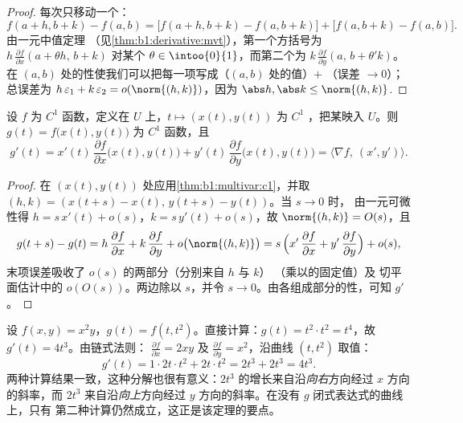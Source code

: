 \begin{proof}
每次只移动一个：
\[
f(a+h, b+k) - f(a,b)
= \bigl[f(a+h, b+k) - f(a, b+k)\bigr] + \bigl[f(a, b+k) -
f(a,b)\bigr].
\]
由一元中值定理
（见\cref{thm:b1:derivative:mvt}），第一个方括号为 $h\,
\frac{\partial f}{\partial x}(a + \theta h,\, b + k)$ 对某个
$\theta \in \intoo{0}{1}$，而第二个为 $k\,\frac{\partial
f}{\partial y}(a,\, b + \theta' k)$。在
$(a,b)$ 处的性使我们可以把每一项写成（$(a,b)$ 处的值）$+$
（误差 $\to 0$）；总误差为 $h\,\varepsilon_1 +
k\,\varepsilon_2 = o(\norm{(h,k)})$，因为 $\abs h, \abs k \leq
\norm{(h,k)}$.
\end{proof}

\begin{theorem}[链式法则]\label{thm:b1:multivar:chain}
设 $f$ 为 $C^1$ 函数，定义在 $U$ 上，$t \mapsto (x(t), y(t))$ 为
$C^1$ ，把某映入 $U$。则 $g(t) = f\bigl(x(t), y(t)\bigr)$
为 $C^1$ 函数，且
\[
g'(t) = x'(t)\,\frac{\partial f}{\partial x}\bigl(x(t),y(t)\bigr)
+ y'(t)\,\frac{\partial f}{\partial y}\bigl(x(t),y(t)\bigr)
= \bigl\langle \nabla f,\ (x', y')\bigr\rangle .
\]
\end{theorem}

\begin{proof}
在 $(x(t), y(t))$ 处应用\cref{thm:b1:multivar:c1}，并取 $(h, k) =
(x(t+s) - x(t),\, y(t+s) - y(t))$。当 $s \to 0$ 时，
由一元可微性得 $h = s\,x'(t) + o(s)$，$k = s\,y'(t)
+ o(s)$，故 $\norm{(h, k)} = O(s)$，且
\[
g(t+s) - g(t)
= h\,\frac{\partial f}{\partial x} + k\,\frac{\partial
f}{\partial y} + o\bigl(\norm{(h,k)}\bigr)
= s\,\Bigl(x'\,\frac{\partial f}{\partial x} +
y'\,\frac{\partial f}{\partial y}\Bigr) + o(s) ,
\]
末项误差吸收了 $o(s)$ 的两部分（分别来自 $h$ 与 $k$）
（乘以的固定值）及
切平面估计中的 $o(O(s))$。两边除以 $s$，并令
$s \to 0$。由各组成部分的性，可知 $g'$
。
\end{proof}

\begin{example}[链式法则的两种验证]
\label{ex:b1:multivar:chainrun}
设 $f(x, y) = x^2 y$，$g(t) = f(t, t^2)$。直接计算：$g(t) =
t^2\cdot t^2 = t^4$，故 $g'(t) = 4t^3$。由链式法则：
$\frac{\partial f}{\partial x} = 2xy$ 及 $\frac{\partial
f}{\partial y} = x^2$，沿曲线 $(t, t^2)$ 取值：
\[
g'(t) = 1\cdot 2t\cdot t^2 + 2t\cdot t^2 = 2t^3 + 2t^3 = 4t^3 .
\]
两种计算结果一致，这种分解也很有意义：$2t^3$
的增长来自沿\emph{向右}方向经过
$x$ 方向的斜率，而 $2t^3$ 来自沿\emph{向上}方向经过
$y$ 方向的斜率。在没有 $g$ 闭式表达式的曲线上，只有
第二种计算仍然成立，这正是该定理的要点。
\end{example}

